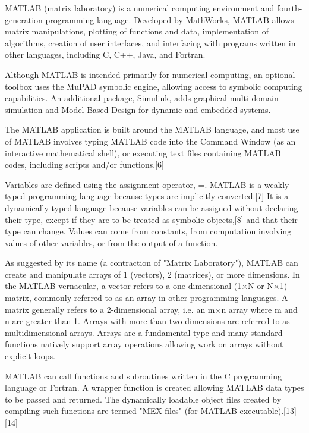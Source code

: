 	MATLAB (matrix laboratory) is a numerical computing environment and fourth-generation programming language. Developed by MathWorks, MATLAB allows matrix manipulations, plotting of functions and data, implementation of algorithms, creation of user interfaces, and interfacing with programs written in other languages, including C, C++, Java, and Fortran.
	
	\vpara
	Although MATLAB is intended primarily for numerical computing, an optional toolbox uses the MuPAD symbolic engine, allowing access to symbolic computing capabilities. An additional package, Simulink, adds graphical multi-domain simulation and Model-Based Design for dynamic and embedded systems.
	
	\vpara
	The MATLAB application is built around the MATLAB language, and most use of MATLAB involves typing MATLAB code into the Command Window (as an interactive mathematical shell), or executing text files containing MATLAB codes, including scripts and/or functions.[6]
	
	\vpara
	Variables are defined using the assignment operator, =. MATLAB is a weakly typed programming language because types are implicitly converted.[7] It is a dynamically typed language because variables can be assigned without declaring their type, except if they are to be treated as symbolic objects,[8] and that their type can change. Values can come from constants, from computation involving values of other variables, or from the output of a function. 
	
	\vpara
	As suggested by its name (a contraction of "Matrix Laboratory"), MATLAB can create and manipulate arrays of 1 (vectors), 2 (matrices), or more dimensions. In the MATLAB vernacular, a vector refers to a one dimensional (1×N or N×1) matrix, commonly referred to as an array in other programming languages. A matrix generally refers to a 2-dimensional array, i.e. an m×n array where m and n are greater than 1. Arrays with more than two dimensions are referred to as multidimensional arrays. Arrays are a fundamental type and many standard functions natively support array operations allowing work on arrays without explicit loops.
	
	\vpara
	MATLAB can call functions and subroutines written in the C programming language or Fortran. A wrapper function is created allowing MATLAB data types to be passed and returned. The dynamically loadable object files created by compiling such functions are termed "MEX-files" (for MATLAB executable).[13][14]
	
